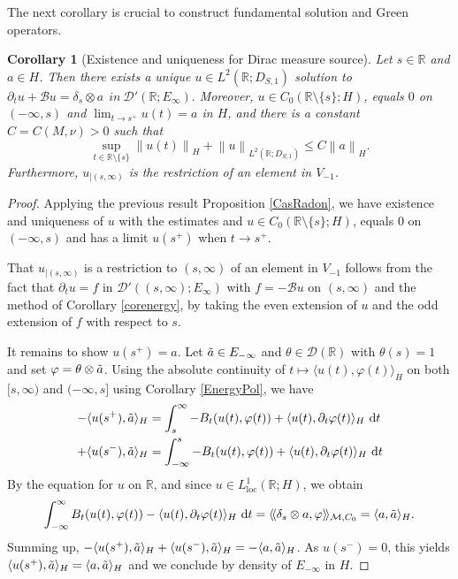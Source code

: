 \documentclass[11pt, letterpaper]{amsart}
\newtheorem{cor}[thm]{Corollary}
\theoremstyle{definition}
\theoremstyle{remark}
\newcommand{\llangle}{\langle\!\langle}
\newcommand{\rrangle}{\rangle\!\rangle}
\numberwithin{equation}{section}
\begin{document}
The next corollary is crucial to construct fundamental solution and Green operators.
\begin{cor}[Existence and uniqueness for Dirac measure source]\label{CorRadon}
Let $s \in \mathbb{R}$ and $a \in H$. Then there exists a unique $u \in L^2(\mathbb{R};D_{S,1})$ solution to
   $ \partial_t u + \mathcal{B}u = \delta_s \otimes a \ \ in \ \mathcal{D}'(\mathbb{R};E_{\infty}).$
Moreover, $u\in C_0(\mathbb{R}\setminus  \{ s  \}; H)$, equals  $0$ on $(-\infty,s)$ and $\lim_{t \to s^+} u(t)=a$ in $H$,  and there is a constant $C=C(M,\nu)>0$ such that 
    \begin{equation*}
        \sup_{t\in \mathbb{R}\setminus\{s\}}\left \|u(t)  \right \|_H + \left \| u \right \|_{L^2(\mathbb{R};D_{S,1})}
        \leq C \left \| a \right \|_H.
    \end{equation*}
Furthermore, {$u_{\scriptscriptstyle{\vert (s,\infty)}}$ is the restriction of an element in $V_{-1}$}.
\end{cor}
\begin{proof} Applying the previous result Proposition \ref{CasRadon}, we have existence and uniqueness of $u$ with the estimates and  $u \in C_0(\mathbb{R}\setminus  \{ s  \};H)$, equals  $0$ on $(-\infty,s)$ and has a limit $u(s^{+})$ when  $t \to s^+$. 

 That $u_{\scriptscriptstyle{\vert (s,\infty)}}$ is a restriction to $(s,\infty)$ of an element in $V_{-1}$ follows from the fact that $\partial_t u=f$ {in $\mathcal{D}'((s,\infty);E_\infty)$} with $f= -\mathcal{B}u$ on $(s,\infty)$ and the method of Corollary \ref{corenergy}, by taking the even extension of $u$ and the odd extension of $f$ with respect to $s$. 
 
It remains to show $u(s^{+})=a$. Let $\Tilde{a}\in E_{-\infty}$ and $\theta\in \mathcal{D}(\mathbb{R})$ with $\theta(s)=1$ and set $\varphi=\theta\otimes \Tilde{a}$. Using the absolute continuity of $t\mapsto \langle u(t), \varphi(t)\rangle_H$ on both $[s,\infty)$ and $(-\infty,s]$ using Corollary \ref{EnergyPol}, we have
\begin{align*}
    - \langle u(s^+), \Tilde{a}\rangle_H &= \int_s^\infty - B_t(u(t),\varphi(t)) + \langle u(t), \partial_t\varphi(t)\rangle_H \  \mathrm d t
    \\
    + \langle u(s^-), \Tilde{a}\rangle_H &= \int_{-\infty}^s - B_t(u(t),\varphi(t)) + \langle u(t), \partial_t\varphi(t)\rangle_H \  \mathrm d t
    \end{align*}
    By the equation for $u$ on $\mathbb{R}$, and since $u\in L^1_{\mathrm{loc}}(\mathbb{R}; H)$,   we obtain
    \begin{equation*}
    \int_{-\infty}^\infty  B_t(u(t),\varphi(t)) - \langle u(t), \partial_t\varphi(t)\rangle_H \  \mathrm d t = \llangle \delta_s \otimes a,  \varphi \rrangle_{\mathcal{M},C_0}= 
    \langle a, \Tilde{a}\rangle_H.
\end{equation*}
Summing up,  $- \langle u(s^+), \Tilde{a}\rangle_H+ \langle u(s^-), \Tilde{a}\rangle_H= - \langle a, \Tilde{a}\rangle_H$. As $u(s^-)=0$, this yields 
$\langle u(s^+), \Tilde{a}\rangle_H= \langle a, \Tilde{a}\rangle_H$ and we conclude by density of $E_{-\infty}$ in $H$.
\end{proof}
\end{document}
